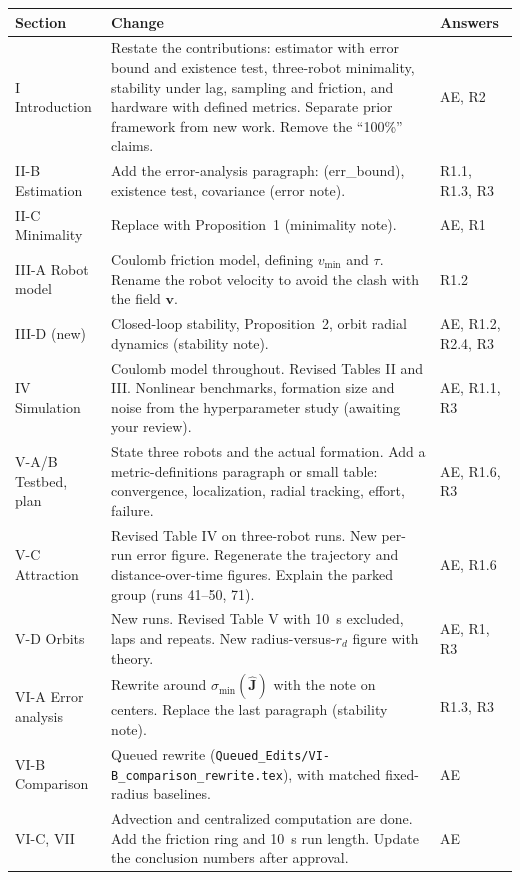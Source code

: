 \documentclass[10pt]{article}
\begin{document}
\small
\begin{tabular}{>{\raggedright\arraybackslash}p{0.95in}>{\raggedright\arraybackslash}p{4.25in}>{\raggedright\arraybackslash}p{1.15in}}
\toprule
\textbf{Section} & \textbf{Change} & \textbf{Answers} \\
\midrule
I Introduction & Restate the contributions: estimator with error bound and existence test, three-robot minimality, stability under lag, sampling and friction, and hardware with defined metrics. Separate prior framework from new work. Remove the ``100\%'' claims. & AE, R2 \\
II-B Estimation & Add the error-analysis paragraph: (err\_bound), existence test, covariance (error note). & R1.1, R1.3, R3 \\
II-C Minimality & Replace with Proposition~1 (minimality note). & AE, R1 \\
III-A Robot model & Coulomb friction model, defining $v_{\min}$ and $\tau$. Rename the robot velocity to avoid the clash with the field $\mathbf{v}$. & R1.2 \\
III-D (new) & Closed-loop stability, Proposition~2, orbit radial dynamics (stability note). & AE, R1.2, R2.4, R3 \\
IV Simulation & Coulomb model throughout. Revised Tables II and III. Nonlinear benchmarks, formation size and noise from the hyperparameter study (awaiting your review). & AE, R1.1, R3 \\
V-A/B Testbed, plan & State three robots and the actual formation. Add a metric-definitions paragraph or small table: convergence, localization, radial tracking, effort, failure. & AE, R1.6, R3 \\
V-C Attraction & Revised Table IV on three-robot runs. New per-run error figure. Regenerate the trajectory and distance-over-time figures. Explain the parked group (runs 41--50, 71). & AE, R1.6 \\
V-D Orbits & New runs. Revised Table V with 10~s excluded, laps and repeats. New radius-versus-$r_d$ figure with theory. & AE, R1, R3 \\
VI-A Error analysis & Rewrite around $\sigma_{\min}(\hat{\mathbf{J}})$ with the note on centers. Replace the last paragraph (stability note). & R1.3, R3 \\
VI-B Comparison & Queued rewrite (\texttt{Queued\_Edits/VI-B\_comparison\_rewrite.tex}), with matched fixed-radius baselines. & AE \\
VI-C, VII & Advection and centralized computation are done. Add the friction ring and 10~s run length. Update the conclusion numbers after approval. & AE \\
\bottomrule
\end{tabular}
\normalsize
\end{document}
